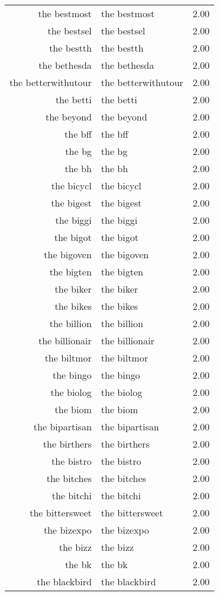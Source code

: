 \begin{table}[ht]
\begin{tabular}{rlr}
  the bestmost & the bestmost & 2.00 \\ 
  the bestsel & the bestsel & 2.00 \\ 
  the bestth & the bestth & 2.00 \\ 
  the bethesda & the bethesda & 2.00 \\ 
  the betterwithutour & the betterwithutour & 2.00 \\ 
  the betti & the betti & 2.00 \\ 
  the beyond & the beyond & 2.00 \\ 
  the bff & the bff & 2.00 \\ 
  the bg & the bg & 2.00 \\ 
  the bh & the bh & 2.00 \\ 
  the bicycl & the bicycl & 2.00 \\ 
  the bigest & the bigest & 2.00 \\ 
  the biggi & the biggi & 2.00 \\ 
  the bigot & the bigot & 2.00 \\ 
  the bigoven & the bigoven & 2.00 \\ 
  the bigten & the bigten & 2.00 \\ 
  the biker & the biker & 2.00 \\ 
  the bikes & the bikes & 2.00 \\ 
  the billion & the billion & 2.00 \\ 
  the billionair & the billionair & 2.00 \\ 
  the biltmor & the biltmor & 2.00 \\ 
  the bingo & the bingo & 2.00 \\ 
  the biolog & the biolog & 2.00 \\ 
  the biom & the biom & 2.00 \\ 
  the bipartisan & the bipartisan & 2.00 \\ 
  the birthers & the birthers & 2.00 \\ 
  the bistro & the bistro & 2.00 \\ 
  the bitches & the bitches & 2.00 \\ 
  the bitchi & the bitchi & 2.00 \\ 
  the bittersweet & the bittersweet & 2.00 \\ 
  the bizexpo & the bizexpo & 2.00 \\ 
  the bizz & the bizz & 2.00 \\ 
  the bk & the bk & 2.00 \\ 
  the blackbird & the blackbird & 2.00 \\ 

\end{tabular}
\end{table}

